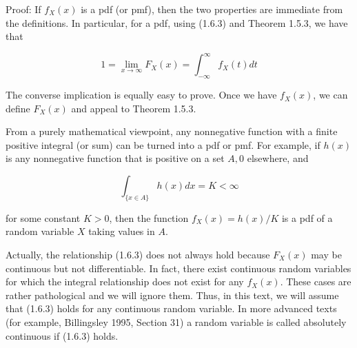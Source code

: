 \documentclass[10pt]{article}
\begin{document}
Proof: If $f_{X}(x)$ is a pdf (or pmf), then the two properties are immediate from the definitions. In particular, for a pdf, using (1.6.3) and Theorem 1.5.3, we have that

$$
1=\lim _{x \rightarrow \infty} F_{X}(x)=\int_{-\infty}^{\infty} f_{X}(t) d t
$$

The converse implication is equally easy to prove. Once we have $f_{X}(x)$, we can define $F_{X}(x)$ and appeal to Theorem 1.5.3.

From a purely mathematical viewpoint, any nonnegative function with a finite positive integral (or sum) can be turned into a pdf or pmf. For example, if $h(x)$ is any nonnegative function that is positive on a set $A, 0$ elsewhere, and

$$
\int_{\{x \in A\}} h(x) d x=K<\infty
$$

for some constant $K>0$, then the function $f_{X}(x)=h(x) / K$ is a pdf of a random variable $X$ taking values in $A$.

Actually, the relationship (1.6.3) does not always hold because $F_{X}(x)$ may be continuous but not differentiable. In fact, there exist continuous random variables for which the integral relationship does not exist for any $f_{X}(x)$. These cases are rather pathological and we will ignore them. Thus, in this text, we will assume that (1.6.3) holds for any continuous random variable. In more advanced texts (for example, Billingsley 1995, Section 31) a random variable is called absolutely continuous if (1.6.3) holds.
\end{document}
